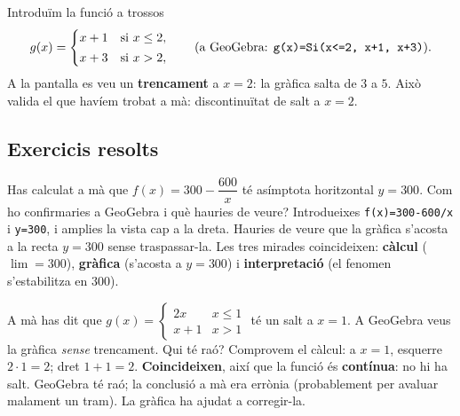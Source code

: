 \begin{exemple}
Introduïm la funció a trossos
\[
g(x)=
\begin{cases}
x+1 & \text{si } x\le 2,\\[2pt]
x+3 & \text{si } x>2,
\end{cases}
\qquad\text{(a GeoGebra: \texttt{g(x)=Si(x<=2, x+1, x+3)})}.
\]
A la pantalla es veu un \textbf{trencament} a $x=2$: la gràfica salta de $3$ a $5$.
Això valida el que havíem trobat a mà: discontinuïtat de salt a $x=2$.

\begin{center}

\end{center}
\end{exemple}

\subsection{Exercicis resolts}

\begin{exresolt}
Has calculat a mà que $f(x)=300-\dfrac{600}{x}$ té asímptota horitzontal $y=300$. Com
ho confirmaries a GeoGebra i què hauries de veure?
\solucio
Introdueixes \texttt{f(x)=300-600/x} i \texttt{y=300}, i amplies la vista cap a la
dreta. Hauries de veure que la gràfica s'acosta a la recta $y=300$ sense traspassar-la.
Les tres mirades coincideixen: \textbf{càlcul} ($\lim=300$), \textbf{gràfica} (s'acosta
a $y=300$) i \textbf{interpretació} (el fenomen s'estabilitza en $300$).
\end{exresolt}

\begin{exresolt}
A mà has dit que $g(x)=\begin{cases}2x & x\le 1\\ x+1 & x>1\end{cases}$ té un salt a
$x=1$. A GeoGebra veus la gràfica \emph{sense} trencament. Qui té raó?
\solucio
Comprovem el càlcul: a $x=1$, esquerre $2\cdot 1=2$; dret $1+1=2$. \textbf{Coincideixen},
així que la funció és \textbf{contínua}: no hi ha salt. GeoGebra té raó; la conclusió
a mà era errònia (probablement per avaluar malament un tram). La gràfica ha ajudat a
corregir-la.
\end{exresolt}

